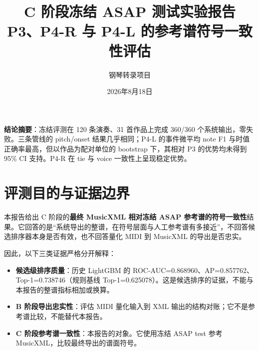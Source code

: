 \documentclass[UTF8,a4paper,11pt]{ctexart}
\title{C 阶段冻结 ASAP 测试实验报告\\\large P3、P4-R 与 P4-L 的参考谱符号一致性评估}
\author{钢琴转录项目}
\date{2026年8月18日}
\begin{document}
\maketitle
\begin{center}\colorbox{light}{\parbox{0.91\linewidth}{\centering\textcolor{accent}{\textbf{结论摘要}}：冻结评测在 120 条演奏、31 首作品上完成 360/360 个系统输出，零失败。三条管线的 pitch/onset 结果几乎相同；P4-L 的事件微平均 note F1 与时值正确率最高，但以作品为配对单位的 bootstrap 下，其相对 P3 的优势均未得到 95\% CI 支持。P4-R 在 tie 与 voice 一致性上呈现稳定优势。}}
\end{center}

\section{评测目的与证据边界}
本报告给出 C 阶段的\textbf{最终 MusicXML 相对冻结 ASAP 参考谱的符号一致性}结果。它回答的是“系统导出的整谱，在符号层面与人工参考谱有多接近”，不回答候选排序器本身是否有效，也不回答量化 MIDI 到 MusicXML 的导出是否忠实。

因此，以下三类证据严格分开解释：
\begin{itemize}
  \item \textbf{候选级排序质量}：历史 LightGBM 的 ROC-AUC=0.868960、AP=0.857762、Top-1=0.738746（规则基线 Top-1=0.625078）。这是候选排序的证据，不能与本报告的整谱指标相加或换算。
  \item \textbf{B 阶段导出忠实性}：评估 MIDI 量化输入到 XML 输出的结构对账；它不是参考谱比较，不能替代本报告。
  \item \textbf{C 阶段参考谱一致性}：本报告的对象。它使用冻结 ASAP test 参考 MusicXML，比较最终导出的谱面符号。
\end{itemize}
\end{document}
